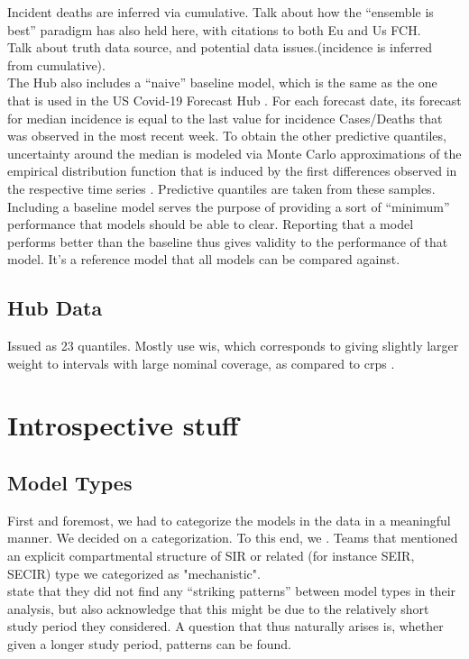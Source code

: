 Incident deaths are inferred via cumulative.
Talk about how the ``ensemble is best'' paradigm has also held here, with citations to both Eu and Us FCH.\\
Talk about truth data source, and potential data issues.(incidence is inferred from cumulative).\\
The Hub also includes a ``naive'' baseline model, which is the same as the one that is used in the US Covid-19 Forecast Hub . For each forecast date, its forecast for median incidence is equal to the last value for incidence Cases/Deaths that was observed in the most recent week. To obtain the other predictive quantiles, uncertainty around the median is modeled via Monte Carlo approximations of the empirical distribution function that is induced by the first differences observed in the respective time series \citep{cramer_evaluation_nodate}. Predictive quantiles are taken from these samples. Including a baseline model serves the purpose of providing a sort of ``minimum'' performance that models should be able to clear. Reporting that a model performs better than the baseline thus gives validity to the performance of that model. It's a reference model that all models can be compared against. 
\subsection{Hub Data}
Issued as 23 quantiles. Mostly use \ac{wis}, which corresponds to giving slightly larger weight to intervals with large nominal coverage, as compared to \ac{crps} \citep{bracher_evaluating_2021}.
\section{Introspective stuff}
\subsection{Model Types}
First and foremost, we had to categorize the models in the data in a meaningful manner. We decided on a categorization. To this end, we . Teams that mentioned an explicit compartmental structure of SIR or related (for instance SEIR, SECIR) type we categorized as "mechanistic".\\
\citep{bracher_evaluating_2021} state that they did not find any ``striking patterns'' between model types in their analysis, but also acknowledge that this might be due to the relatively short study period they considered. A question that thus naturally arises is, whether given a longer study period, patterns can be found.\\

